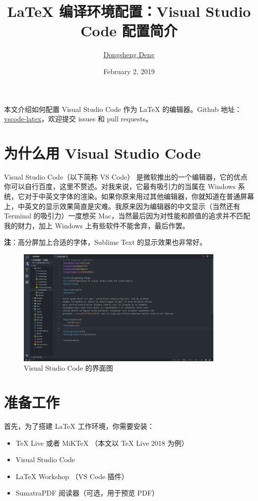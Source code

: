 \documentclass{article}
\title{\bfseries \LaTeX{} 编译环境配置：Visual Studio Code 配置简介}
\author{\href{https://ddswhu.me/}{Dongsheng Deng}}
\date{February 2, 2019}
\begin{document}
\maketitle

本文介绍如何配置 Visual Studio Code 作为 \LaTeX{} 的编辑器。Github 地址：\href{https://github.com/EthanDeng/vscode-latex}{vscode-latex}，欢迎提交 issues 和 pull requests。

\section{为什么用 Visual Studio Code}
Visual Studio Code（以下简称 VS Code） 是微软推出的一个编辑器，它的优点你可以自行百度，这里不赘述。对我来说，它最有吸引力的当属在 Windows 系统，它对于中英文字体的渲染。如果你原来用过其他编辑器，你就知道在普通屏幕上，中英文的显示效果简直是灾难。我原来因为编辑器的中文显示（当然还有 Terminal 的吸引力）一度想买 Mac，当然最后因为对性能和颜值的追求并不匹配我的财力，加上 Windows 上有些软件不能舍弃，最后作罢。

\textbf{注}：高分屏加上合适的字体，Sublime Text 的显示效果也非常好。

\begin{figure}[htbp]
  \centering
  \includegraphics[width=0.9\textwidth]{vscode.png}
  \caption{Visual Studio Code 的界面图}
  \label{fig:vscode}
\end{figure}



\section{准备工作}
首先，为了搭建 \LaTeX{} 工作环境，你需要安装：

\begin{itemize}
  \item \TeX{} Live 或者 MiKTeX （本文以 \TeX{} Live 2018 为例）
  \item Visual Studio Code
  \item \LaTeX{} Workshop （VS Code 插件）
  \item SumatraPDF 阅读器（可选，用于预览 PDF）
\end{itemize}
\end{document}

